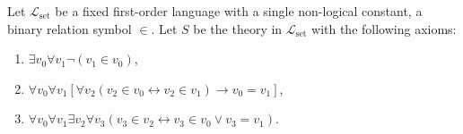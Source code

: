 Let $\mathcal{L}_{\text{set}}$ be a fixed first-order language with a single non-logical constant, a binary relation symbol $\in$. Let $S$ be the theory in $\mathcal{L}_{\text{set}}$ with the following axioms:

\begin{enumerate}
\item[(1)] $\exists v_0 \forall v_1 \neg (v_1 \in v_0)$,
\item[(2)] $\forall v_0 \forall v_1 [\forall v_2(v_2 \in v_0 \leftrightarrow v_2 \in v_1) \rightarrow v_0 = v_1]$,
\item[(3)] $\forall v_0 \forall v_1 \exists v_2 \forall v_3(v_3 \in v_2 \leftrightarrow v_3 \in v_0 \lor v_3 = v_1)$.
\end{enumerate}
